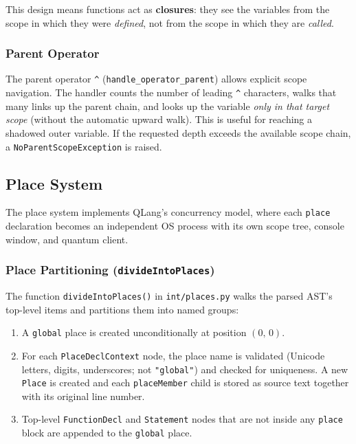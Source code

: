 This design means functions act as \textbf{closures}: they see the
variables from the scope in which they were \emph{defined}, not from the
scope in which they are \emph{called}.

\subsubsection{Parent Operator}

The parent operator \texttt{\^{}} (\texttt{handle\_operator\_parent})
allows explicit scope navigation.  The handler counts the number of
leading \texttt{\^{}} characters, walks that many links up the parent
chain, and looks up the variable \emph{only in that target scope}
(without the automatic upward walk).  This is useful for reaching a
shadowed outer variable.  If the requested depth exceeds the available
scope chain, a \texttt{NoParentScopeException} is raised.

\subsection{Place System}
\label{sec:impl-places}

The place system implements QLang's concurrency model, where each
\texttt{place} declaration becomes an independent OS process with its
own scope tree, console window, and quantum client.

\subsubsection{Place Partitioning (\texttt{divideIntoPlaces})}

The function \texttt{divideIntoPlaces()} in \texttt{int/places.py} walks
the parsed AST's top-level items and partitions them into named
groups:

\begin{enumerate}
    \item A \texttt{global} place is created unconditionally at position
          $(0,\,0)$.
    \item For each \texttt{PlaceDeclContext} node, the place name is
          validated (Unicode letters, digits, underscores; not
          \texttt{"global"}) and checked for uniqueness.  A new
          \texttt{Place} is created and each \texttt{placeMember} child
          is stored as source text together with its original line
          number.
    \item Top-level \texttt{FunctionDecl} and \texttt{Statement} nodes
          that are not inside any \texttt{place} block are appended to
          the \texttt{global} place.
\end{enumerate}

